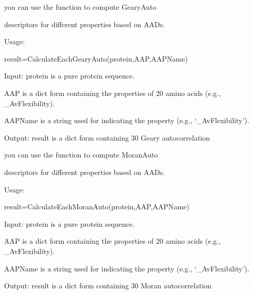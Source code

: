 \documentclass[letterpaper,10pt,english]{sphinxmanual}
\begin{document}

\begin{fulllineitems}
\label{reference/Autocorrelation:Autocorrelation.CalculateEachGearyAuto}
you can use the function to compute GearyAuto

descriptors for different properties based on AADs.

Usage:

result=CalculateEachGearyAuto(protein,AAP,AAPName)

Input: protein is a pure protein sequence.

AAP is a dict form containing the properties of 20 amino acids (e.g., \_AvFlexibility).

AAPName is a string used for indicating the property (e.g., `\_AvFlexibility').

Output: result is a dict form containing 30 Geary autocorrelation

\end{fulllineitems}


\begin{fulllineitems}
\label{reference/Autocorrelation:Autocorrelation.CalculateEachMoranAuto}
you can use the function to compute MoranAuto

descriptors for different properties based on AADs.

Usage:

result=CalculateEachMoranAuto(protein,AAP,AAPName)

Input: protein is a pure protein sequence.

AAP is a dict form containing the properties of 20 amino acids (e.g., \_AvFlexibility).

AAPName is a string used for indicating the property (e.g., `\_AvFlexibility').

Output: result is a dict form containing 30 Moran autocorrelation

\end{fulllineitems}

\end{document}
